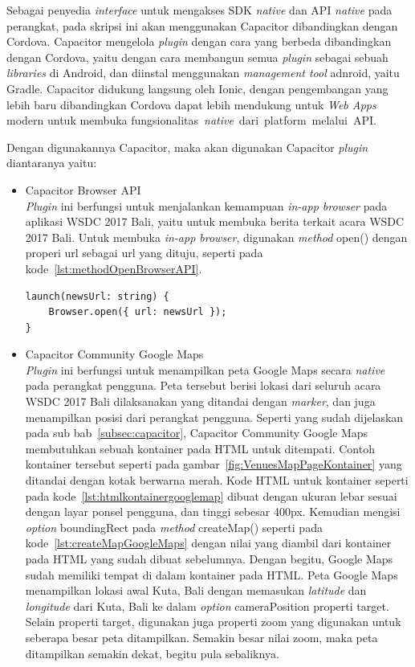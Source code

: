 Sebagai penyedia \textit{interface} untuk mengakses SDK \textit{native} dan API \textit{native} pada perangkat, pada skripsi ini akan menggunakan Capacitor dibandingkan dengan Cordova. Capacitor mengelola \textit{plugin} dengan cara yang berbeda dibandingkan dengan Cordova, yaitu dengan cara membangun semua \textit{plugin} sebagai sebuah \textit{libraries} di Android, dan diinstal menggunakan \textit{management tool} adnroid, yaitu Gradle. Capacitor didukung langsung oleh Ionic, dengan pengembangan yang lebih baru dibandingkan Cordova dapat lebih mendukung untuk \textit{Web Apps} modern untuk membuka fungsionalitas~\textit{native}~dari~platform~melalui~API.

Dengan digunakannya Capacitor, maka akan digunakan Capacitor \textit{plugin} diantaranya yaitu:

\begin{itemize}
	\item Capacitor Browser API \\	
	\textit{Plugin} ini berfungsi untuk menjalankan kemampuan \textit{in-app browser} pada aplikasi WSDC 2017 Bali, yaitu untuk membuka berita terkait acara WSDC 2017 Bali. Untuk membuka \textit{in-app browser}, digunakan \textit{method} open() dengan properi url sebagai url yang dituju, seperti pada kode~\ref{lst:methodOpenBrowserAPI}.
	
\begin{lstlisting}[label={lst:methodOpenBrowserAPI}, caption=\textit{Method} open() Pada Browser API]
launch(newsUrl: string) {
	Browser.open({ url: newsUrl });
}
\end{lstlisting}
	
	\item Capacitor Community Google Maps \\
	\textit{Plugin} ini berfungsi untuk menampilkan peta Google Maps secara \textit{native} pada perangkat pengguna. Peta tersebut berisi lokasi dari seluruh acara WSDC 2017 Bali dilaksanakan yang ditandai dengan \textit{marker}, dan juga menampilkan posisi dari perangkat pengguna. Seperti yang sudah dijelaskan pada sub bab~\ref{subsec:capacitor}, Capacitor Community Google Maps membutuhkan sebuah kontainer pada HTML untuk ditempati. Contoh kontainer tersebut seperti pada gambar~\ref{fig:VenuesMapPageKontainer} yang ditandai dengan kotak berwarna merah. Kode HTML untuk kontainer seperti pada kode~\ref{lst:htmlkontainergooglemap} dibuat dengan ukuran lebar sesuai dengan layar ponsel pengguna, dan tinggi sebesar 400px. Kemudian mengisi \textit{option} boundingRect pada \textit{method} createMap() seperti pada kode~\ref{lst:createMapGoogleMaps} dengan nilai yang diambil dari kontainer pada HTML yang sudah dibuat sebelumnya. Dengan begitu, Google Maps sudah memiliki tempat di dalam kontainer pada HTML. Peta Google Maps menampilkan lokasi awal Kuta, Bali dengan memasukan \textit{latitude} dan \textit{longitude} dari Kuta, Bali ke dalam \textit{option} cameraPosition properti target. Selain properti target, digunakan juga properti zoom yang digunakan untuk seberapa besar peta ditampilkan. Semakin besar nilai zoom, maka peta ditampilkan semakin dekat, begitu pula sebaliknya.
	

\end{itemize}
